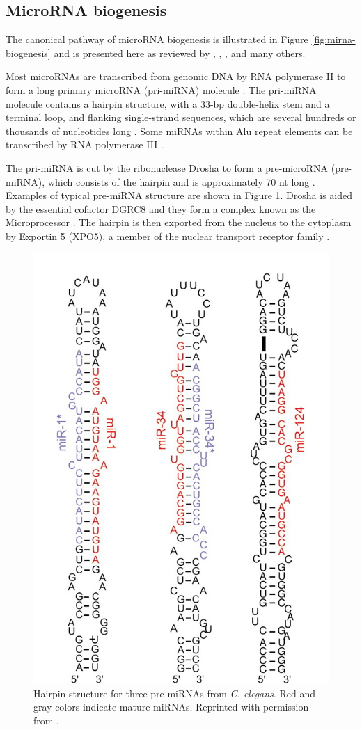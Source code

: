 



\subsection{MicroRNA biogenesis}\label{microrna-biogenesis}

The canonical pathway of microRNA biogenesis is illustrated in Figure
\ref{fig:mirna-biogenesis} and is presented here as reviewed by \citet{Bartel2004},
\citet{Melo2011}, \citet{Ha2014}, and many others. 

Most microRNAs are transcribed from genomic DNA by RNA polymerase II to form a
long primary microRNA (pri-miRNA) molecule \citep{Lee2004}. The pri-miRNA molecule
contains a hairpin structure, with a 33-bp double-helix stem and a terminal
loop, and flanking single-strand sequences, which are several hundreds or
thousands of nucleotides long \citep{Kim2005}. Some miRNAs within Alu repeat elements
can be transcribed by RNA polymerase III \citep{Borchert2006}.

The pri-miRNA is cut by the ribonuclease Drosha to form
a pre-microRNA (pre-miRNA), which consists of the hairpin and is approximately
70 nt long \citep{Lee2003}. Examples of typical pre-miRNA structure are shown in Figure
\ref{fig:premirna-structure}. Drosha is aided by the essential cofactor DGRC8
and they form a complex known as the Microprocessor \citep{Gregory2004}.
The hairpin is then exported from the nucleus to the cytoplasm by Exportin 5
(XPO5), a member of the nuclear transport receptor family \citep{Lund2004}.

\begin{figure}[htb]
  \centering
  \includegraphics[width=0.4\linewidth]{figures/premiRNA_structure.png}
  \caption{Hairpin structure for three pre-miRNAs from \emph{C. elegans}.
  Red and gray colors indicate mature miRNAs.
  Reprinted with permission from \citep{Bartel2004}.}
  \label{fig:premirna-structure}
\end{figure}

